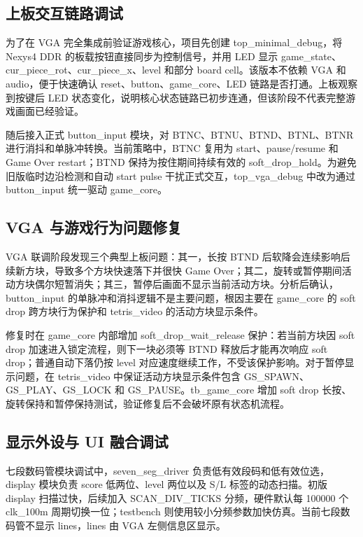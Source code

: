 \documentclass[UTF8,zihao=-4]{ctexart}
\begin{document}
\subsection{上板交互链路调试}

为了在 VGA 完全集成前验证游戏核心，项目先创建 top\_minimal\_debug，将 Nexys4 DDR 的板载按钮直接同步为控制信号，并用 LED 显示 game\_state、cur\_piece\_rot、cur\_piece\_x、level 和部分 board cell。该版本不依赖 VGA 和 audio，便于快速确认 reset、button、game\_core、LED 链路是否打通。上板观察到按键后 LED 状态变化，说明核心状态链路已初步连通，但该阶段不代表完整游戏画面已经验证。

随后接入正式 button\_input 模块，对 BTNC、BTNU、BTND、BTNL、BTNR 进行消抖和单脉冲转换。当前策略中，BTNC 复用为 start、pause/resume 和 Game Over restart；BTND 保持为按住期间持续有效的 soft\_drop\_hold。为避免旧版临时边沿检测和自动 start pulse 干扰正式交互，top\_vga\_debug 中改为通过 button\_input 统一驱动 game\_core。

\subsection{VGA 与游戏行为问题修复}

VGA 联调阶段发现三个典型上板问题：其一，长按 BTND 后软降会连续影响后续新方块，导致多个方块快速落下并很快 Game Over；其二，旋转或暂停期间活动方块偶尔短暂消失；其三，暂停后画面不显示当前活动方块。分析后确认，button\_input 的单脉冲和消抖逻辑不是主要问题，根因主要在 game\_core 的 soft drop 跨方块行为保护和 tetris\_video 的活动方块显示条件。

修复时在 game\_core 内部增加 soft\_drop\_wait\_release 保护：若当前方块因 soft drop 加速进入锁定流程，则下一块必须等 BTND 释放后才能再次响应 soft drop；普通自动下落仍按 level 对应速度继续工作，不受该保护影响。对于暂停显示问题，在 tetris\_video 中保证活动方块显示条件包含 GS\_SPAWN、GS\_PLAY、GS\_LOCK 和 GS\_PAUSE。tb\_game\_core 增加 soft drop 长按、旋转保持和暂停保持测试，验证修复后不会破坏原有状态机流程。

\subsection{显示外设与 UI 融合调试}

七段数码管模块调试中，seven\_seg\_driver 负责低有效段码和低有效位选，display 模块负责 score 低两位、level 两位以及 S/L 标签的动态扫描。初版 display 扫描过快，后续加入 SCAN\_DIV\_TICKS 分频，硬件默认每 100000 个 clk\_100m 周期切换一位；testbench 则使用较小分频参数加快仿真。当前七段数码管不显示 lines，lines 由 VGA 左侧信息区显示。
\end{document}
